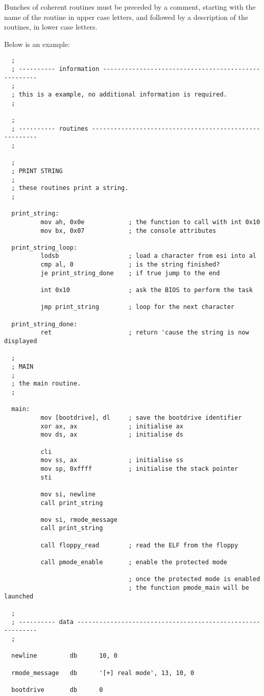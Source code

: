 Bunches of coherent routines must be preceded by a comment, starting with
the name of the routine in upper case letters, and followed by a description
of the routines, in lower case letters.

Below is an example:

\begin{verbatim}
  ;
  ; ---------- information ----------------------------------------------------
  ;
  ; this is a example, no additional information is required.
  ;

  ;
  ; ---------- routines -------------------------------------------------------
  ;

  ;
  ; PRINT STRING
  ;
  ; these routines print a string.
  ;

  print_string:
          mov ah, 0x0e            ; the function to call with int 0x10
          mov bx, 0x07            ; the console attributes

  print_string_loop:
          lodsb                   ; load a character from esi into al
          cmp al, 0               ; is the string finished?
          je print_string_done    ; if true jump to the end

          int 0x10                ; ask the BIOS to perform the task

          jmp print_string        ; loop for the next character

  print_string_done:
          ret                     ; return 'cause the string is now displayed

  ;
  ; MAIN
  ;
  ; the main routine.
  ;

  main:
          mov [bootdrive], dl     ; save the bootdrive identifier
          xor ax, ax              ; initialise ax
          mov ds, ax              ; initialise ds

          cli
          mov ss, ax              ; initialise ss
          mov sp, 0xffff          ; initialise the stack pointer
          sti

          mov si, newline
          call print_string

          mov si, rmode_message
          call print_string

          call floppy_read        ; read the ELF from the floppy

          call pmode_enable       ; enable the protected mode

                                  ; once the protected mode is enabled
                                  ; the function pmode_main will be launched

  ;
  ; ---------- data -----------------------------------------------------------
  ;

  newline         db      10, 0

  rmode_message   db      '[+] real mode', 13, 10, 0

  bootdrive       db      0
\end{verbatim}
